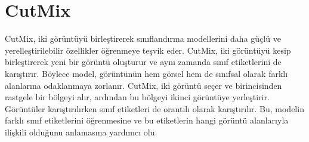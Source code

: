 \section{CutMix}

CutMix, iki görüntüyü birleştirerek sınıflandırma modellerini daha güçlü ve yerelleştirilebilir özellikler öğrenmeye teşvik eder. CutMix, iki görüntüyü kesip birleştirerek yeni bir görüntü oluşturur ve aynı zamanda sınıf etiketlerini de karıştırır. Böylece model, görüntünün hem görsel hem de sınıfsal olarak farklı alanlarına odaklanmaya zorlanır. CutMix, iki görüntü seçer ve birincisinden rastgele bir bölgeyi alır, ardından bu bölgeyi ikinci görüntüye yerleştirir. Görüntüler karıştırılırken sınıf etiketleri de orantılı olarak karıştırılır. Bu, modelin farklı sınıf etiketlerini öğrenmesine ve bu etiketlerin hangi görüntü alanlarıyla ilişkili olduğunu anlamasına yardımcı olu

\newpage